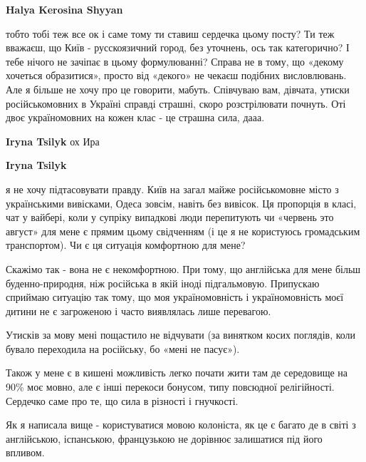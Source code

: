 \begin{itemize}
\begin{itemize}
\textbf{Halya Kerosina Shyyan} 

тобто тобі теж все ок і саме тому ти ставиш сердечка цьому посту? Ти теж
вважаєш, що Київ - русскоязичний город, без уточнень, ось так категорично? І
тебе нічого не зачіпає в цьому формулюванні? Справа не в тому, що «декому
хочеться образитися», просто від «декого» не чекаєш подібних висловлювань. Але
я більше не хочу про це говорити, мабуть. Співчуваю вам, дівчата, утиски
російськомовних в Україні справді страшні, скоро розстрілювати почнуть. Оті
двоє україномовних на кожен клас - це страшна сила, дааа.

 
\textbf{Iryna Tsilyk} ох Ира

 

\textbf{Iryna Tsilyk} 

я не хочу підтасовувати правду. Київ на загал майже
російськомовне місто з українськими вивісками, Одеса зовсім, навіть без
вивісок. Ця пропорція в класі, чат у вайбері, коли у супріку випадкові люди
перепитують чи «червень это август» для мене є прямим цьому свідченням (і це я
не користуюсь громадським транспортом). Чи є ця ситуація комфортною для мене?

Скажімо так - вона не є некомфортною. При тому, що англійська для мене більш
буденно-природня, ніж російська в якій іноді підгальмовую. Припускаю сприймаю
ситуацію так тому, що моя україномовність і україномовність моєї дитини не є
загроженою і часто виявлялась лише перевагою. 

Утисків за мову мені пощастило не
відчувати (за винятком косих поглядів, коли бувало переходила на російську, бо
«мені не пасує»). 

Також у мене є в кишені можливість легко почати жити там де середовище на 90\%
моє мовно, але є інші перекоси бонусом, типу повсюдної релігійності.  Сердечко
саме про те, що сила в різності і гнучкості.

Як я написала вище - користуватися мовою колоніста, як це є багато де в світі з
англійською, іспанською, французькою не дорівнює залишатися під його впливом.


\end{itemize}
\end{itemize}
